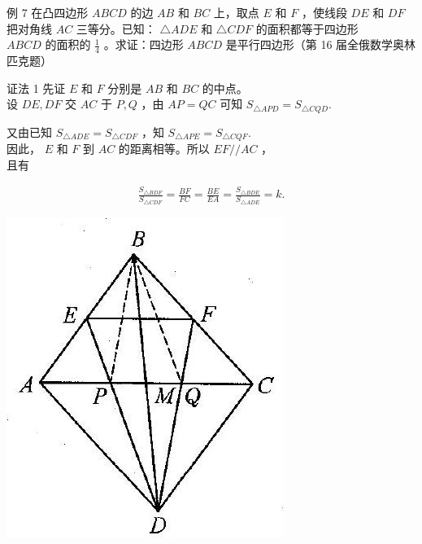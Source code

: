\documentclass[10pt]{article}
\begin{document}
例 7 在凸四边形 $A B C D$ 的边 $A B$ 和 $B C$ 上，取点 $E$ 和 $F$ ，使线段 $D E$ 和 $D F$ 把对角线 $A C$ 三等分。已知： $\triangle A D E$ 和 $\triangle C D F$ 的面积都等于四边形\\
$A B C D$ 的面积的 $\frac{1}{4}$ 。求证：四边形 $A B C D$ 是平行四边形（第 16 届全俄数学奥林匹克题）

证法 1 先证 $E$ 和 $F$ 分别是 $A B$ 和 $B C$ 的中点。\\
设 $D E, D F$ 交 $A C$ 于 $P, Q$ ，由 $A P=Q C$ 可知 $S_{\triangle A P D}=S_{\triangle C Q D}$.

又由已知 $S_{\triangle A D E}=S_{\triangle C D F}$ ，知 $S_{\triangle A P E}=S_{\triangle C Q F}$.\\
因此， $E$ 和 $F$ 到 $A C$ 的距离相等。所以 $E F / / A C$ ，\\
且有

\begin{align*}
\frac{S_{\triangle B D F}}{S_{\triangle C D F}}=\frac{B F}{F C}=\frac{B E}{E A}=\frac{S_{\triangle B D E}}{S_{\triangle A D E}}=k .
\end{align*}

\begin{center}
\includegraphics[max width=\textwidth]{2024_10_30_2c8f45efd4a519b08e1ag-114}
\end{center}
\end{document}
